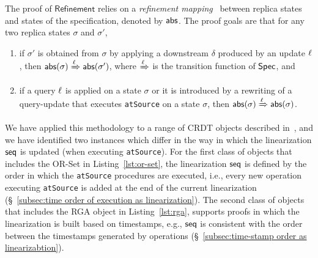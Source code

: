 The proof of $\mathsf{Refinement}$ relies on a \emph{refinement mapping}~\cite{} between replica states and states of the specification, denoted by $\mathsf{abs}$. The proof goals are that for any two replica states $\sigma$ and $\sigma'$,
\begin{enumerate}
	\item if $\sigma'$ is obtained from $\sigma$ by applying a downstream $\delta$ produced by an update $\ell$, then $\mathsf{abs}(\sigma)\xRightarrow{\ensuremath{\ell}}\mathsf{abs}(\sigma')$, where $\xRightarrow{\ensuremath{\ell}}$ is the transition function of $\mathsf{Spec}$, and
	\item if a query $\ell$ is applied on a state $\sigma$ or it is introduced by a rewriting of a query-update that executes {\tt atSource} on a state $\sigma$, then $\mathsf{abs}(\sigma)\xRightarrow{\ensuremath{\ell}}\mathsf{abs}(\sigma)$.
\end{enumerate}

We have applied this methodology to a range of CRDT objects described in~\cite{ShapiroPBZ11}, and we have identified two instances which differ in the way in which the linearization $\mathsf{seq}$ is updated (when executing {\tt atSource}). For the first class of objects that includes the OR-Set in Listing~\ref{lst:or-set}, the linearization $\mathsf{seq}$ is defined by the order in which the {\tt atSource} procedures are executed, i.e., every new operation executing {\tt atSource} is added at the end of the current linearization (\S~\ref{subsec:time order of execution as linearization}). 
The second class of objects that includes the RGA object in Listing~\ref{lst:rga}, supports \CRDTLinshort{} proofs in which the linearization is built based on timestamps, e.g., $\mathsf{seq}$ is consistent with the order between the timestamps generated by operations (\S~\ref{subsec:time-stamp order as linearizabtion}).


